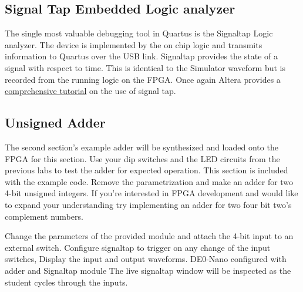   \subsection{Signal Tap Embedded Logic analyzer}
    The single most valuable debugging tool in Quartus is the Signaltap Logic analyzer. The device is implemented by the on chip logic and transmits information to Quartus over the USB link.  Signaltap provides the state of a signal with respect to time. This is identical to the Simulator waveform but is recorded from the running logic on the FPGA. Once again Altera provides a \href{ftp://ftp.altera.com/up/pub/Altera_Material/13.0/Tutorials/Verilog/SignalTap.pdf}{comprehensive tutorial} on the use of signal tap.

  \subsection{Unsigned Adder}
    The second section's example adder will be synthesized and loaded onto the FPGA for this section. Use your dip switches and the LED circuits from the previous labs to test the adder for expected operation. This section is included with the example code. Remove the parametrization and make an adder for two 4-bit unsigned integers. If you're interested in FPGA development and would like to expand your understanding try implementing an adder for two four bit two's complement numbers. 

         {Change the parameters of the provided module and attach the 4-bit input to an external switch. Configure signaltap to trigger on any change of the input switches, Display the input and output waveforms.}
         {DE0-Nano configured with adder and Signaltap module}
         {The live signaltap window will be inspected as the student cycles through the inputs.}

